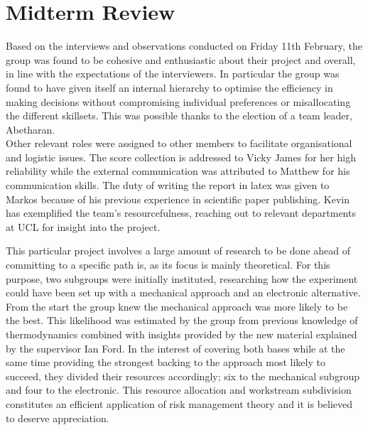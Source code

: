 \chapter{Midterm Review}\label{midterm review}\label{section \thechapter}

\vspace{15pt}

Based on the interviews and observations conducted on Friday 11th February, the group was found to be cohesive and enthusiastic about their project and overall, in line with the expectations of the interviewers. In particular the group was found to have given itself an internal hierarchy to optimise the efficiency in making decisions without compromising individual preferences or misallocating the different skillsets. This was possible thanks to the election of a team leader, Abetharan.\\
Other relevant roles were assigned to other members to facilitate organisational and logistic issues. The score collection is addressed to Vicky James for her high reliability while the external communication was attributed to Matthew for his communication skills. The duty of writing the report in latex was given to Markos because of his previous experience in scientific paper publishing. Kevin has exemplified the team's resourcefulness, reaching out to relevant departments at UCL for insight into the project.

This particular project involves a large amount of research to be done ahead of committing to a specific path is, as its focus is mainly theoretical. For this purpose, two subgroups were initially instituted, researching how the experiment could have been set up with a mechanical approach and an electronic alternative.\\
From the start the group knew the mechanical approach was more likely to be the best. This likelihood was estimated by the group from previous knowledge of thermodynamics combined with insights provided by the new material explained by the supervisor Ian Ford. In the interest of covering both bases while at the same time providing the strongest backing to the approach most likely to succeed, they divided their resources accordingly; six to the mechanical subgroup and four to the electronic. This resource allocation and workstream subdivision constitutes an efficient application of risk management theory and it is believed to deserve appreciation.


